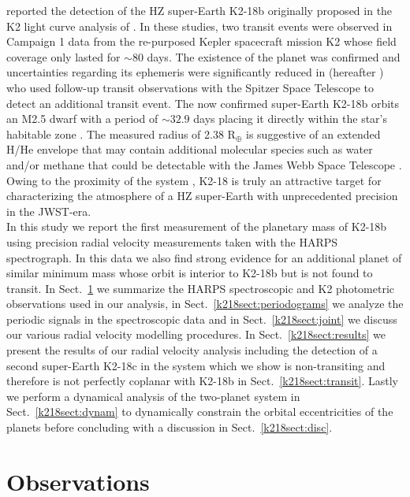 \cite{montet15} reported the detection of the HZ super-Earth K2-18b originally proposed in
the K2 light curve analysis of \cite{foremanmackey15b}. In these studies,
two transit events were observed in Campaign 1 data from the
re-purposed Kepler spacecraft mission K2 whose field coverage only lasted for
$\sim 80$ days. The existence of the planet was
confirmed and uncertainties regarding its ephemeris were significantly reduced in
\cite{benneke17} (hereafter )
who used follow-up transit observations with the Spitzer Space Telescope to
detect an additional transit event. The now confirmed
super-Earth K2-18b orbits an M2.5 dwarf with a period of $\sim 32.9$ days placing it directly within
the star's habitable zone \citep{kopparapu13}. The measured radius of
2.38 R$_{\oplus}$ is suggestive of an extended H/He envelope \citep{valencia13, rogers15, fulton17} that may
contain additional molecular species such as water and/or methane that could be detectable with the
James Webb Space Telescope \citep[JWST;][]{beichman14}.
Owing to the proximity of the system
\citep[$\sim 34$ pc, $V=13.5$, $I=11.7$, $K=8.9$;][]{cutri03, zacharias13}, K2-18
is truly an attractive target for characterizing the atmosphere of a HZ super-Earth with
unprecedented precision in the JWST-era. \\

In this study we report the first measurement of the planetary mass of K2-18b using precision
radial velocity measurements taken with the HARPS spectrograph. In this data we also find strong
evidence for an additional planet of similar minimum mass whose orbit is interior to K2-18b but is not found
to transit. In Sect.~\ref{k218sect:obs} we summarize the HARPS spectroscopic and K2 photometric
observations used in our analysis,
in Sect.~\ref{k218sect:periodograms} we analyze the periodic signals in the spectroscopic data
and in Sect.~\ref{k218sect:joint} we discuss our various radial velocity modelling procedures.
In Sect.~\ref{k218sect:results} 
we present the results of our radial velocity analysis including the detection of a second 
super-Earth K2-18c in the system which we show is non-transiting and therefore is not perfectly
coplanar with K2-18b in Sect.~\ref{k218sect:transit}.
Lastly we perform a dynamical analysis of the two-planet system in Sect.~\ref{k218sect:dynam} to
dynamically constrain the orbital eccentricities of the planets  
before concluding with a discussion in Sect.~\ref{k218sect:disc}.

\section{Observations} \label{k218sect:obs}
